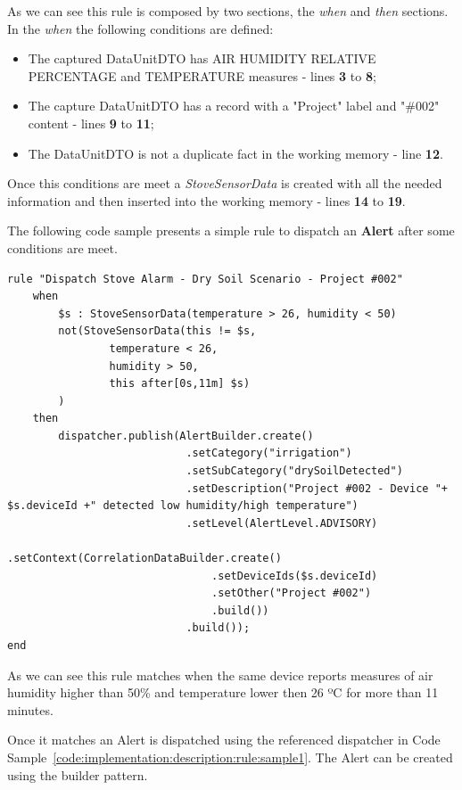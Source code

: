As we can see this rule is composed by two sections, the \textit{when} and \textit{then} sections. In the \textit{when} the following conditions are defined:

\begin{itemize}
    \item The captured DataUnitDTO has AIR HUMIDITY RELATIVE PERCENTAGE and TEMPERATURE measures - lines \textbf{3} to \textbf{8};
    \item The capture DataUnitDTO has a record with a "Project" label and "\#002" content - lines \textbf{9} to \textbf{11};
    \item The DataUnitDTO is not a duplicate fact in the working memory - line \textbf{12}.
\end{itemize}

Once this conditions are meet a \textit{StoveSensorData} is created with all the needed information and then inserted into the working memory - lines \textbf{14} to \textbf{19}.

The following code sample presents a simple rule to dispatch an \textbf{Alert} after some conditions are meet.

\begin{lstlisting}[style=drools, caption=Rule Scenario Example - Part 3, label={code:implementation:description:rule:sample3}]
rule "Dispatch Stove Alarm - Dry Soil Scenario - Project #002"
    when
        $s : StoveSensorData(temperature > 26, humidity < 50)
        not(StoveSensorData(this != $s,
                temperature < 26,
                humidity > 50,
                this after[0s,11m] $s)
        )
    then
        dispatcher.publish(AlertBuilder.create()
                            .setCategory("irrigation")
                            .setSubCategory("drySoilDetected")
                            .setDescription("Project #002 - Device "+ $s.deviceId +" detected low humidity/high temperature")
                            .setLevel(AlertLevel.ADVISORY)
                            .setContext(CorrelationDataBuilder.create()
                                .setDeviceIds($s.deviceId)
                                .setOther("Project #002")
                                .build())
                            .build());
end
\end{lstlisting}

As we can see this rule matches when the same device reports measures of air humidity higher than 50\% and temperature lower then 26 ºC for more than 11 minutes.

Once it matches an Alert is dispatched using the referenced dispatcher in Code Sample~\ref{code:implementation:description:rule:sample1}. The Alert can be created using the builder pattern.

